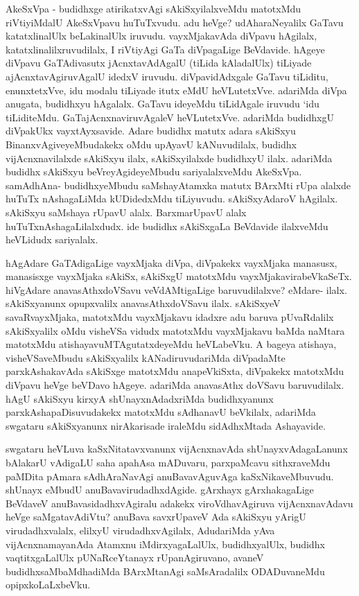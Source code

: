 \begin{artha}
AkeSxVpa - budidhxge atirikatxvAgi sAkiSxyilalxveMdu matotxMdu riVtiyiMdalU AkeSxVpavu huTuTxvudu. adu heVge? udAharaNeyalilx GaTavu katatxlinalUlx beLakinalUlx iruvudu. vayxMjakavAda diVpavu hAgilalx, katatxlinalilxruvudilalx, I riVtiyAgi GaTa diVpagaLige BeVdavide. hAgeye diVpavu GaTAdivasutx jAcnxtavAdAgalU (tiLida kAladalUlx) tiLiyade ajAcnxtavAgiruvAgalU idedxV iruvudu. diVpavidAdxgale GaTavu tiLiditu, enunxtetxVve, idu modalu tiLiyade itutx eMdU heVLutetxVve. adariMda diVpa anugata, budidhxyu hAgalalx. GaTavu ideyeMdu tiLidAgale iruvudu `idu tiLiditeMdu. GaTajAcnxnaviruvAgaleV heVLutetxVve. adariMda budidhxgU diVpakUkx vayxtAyxsavide. Adare budidhx matutx adara sAkiSxyu BinanxvAgiveyeMbudakekx oMdu upAyavU kANuvudilalx, budidhx vijAcnxnavilalxde sAkiSxyu ilalx, sAkiSxyilalxde budidhxyU ilalx. adariMda budidhx sAkiSxyu beVreyAgideyeMbudu sariyalalxveMdu AkeSxVpa. samAdhAna- budidhxyeMbudu saMshayAtamxka matutx BArxMti rUpa alalxde huTuTx nAshagaLiMda kUDidedxMdu tiLiyuvudu. sAkiSxyAdaroV hAgilalx. sAkiSxyu saMshaya rUpavU alalx. BarxmarUpavU alalx huTuTxnAshagaLilalxdudx. ide budidhx sAkiSxgaLa BeVdavide ilalxveMdu heVLidudx sariyalalx. 
\end{artha}%

\begin{artha}
hAgAdare GaTAdigaLige vayxMjaka diVpa, diVpakekx vayxMjaka manasusx, manasisxge vayxMjaka sAkiSx, sAkiSxgU matotxMdu vayxMjakavirabeVkaSeTx. hiVgAdare anavasAthxdoVSavu veVdAMtigaLige baruvudilalxve? eMdare- ilalx. sAkiSxyanunx opupxvalilx anavasAthxdoVSavu ilalx. sAkiSxyeV savaRvayxMjaka, matotxMdu vayxMjakavu idadxre adu baruva pUvaRdalilx sAkiSxyalilx oMdu visheVSa vidudx matotxMdu vayxMjakavu baMda naMtara matotxMdu atishayavuMTAgutatxdeyeMdu heVLabeVku. A bageya atishaya, visheVSaveMbudu sAkiSxyalilx kANadiruvudariMda diVpadaMte parxkAshakavAda sAkiSxge matotxMdu anapeVkiSxta, diVpakekx matotxMdu diVpavu heVge beVDavo hAgeye. adariMda anavasAthx doVSavu baruvudilalx. hAgU sAkiSxyu kirxyA shUnayxnAdadxriMda budidhxyanunx parxkAshapaDisuvudakekx matotxMdu sAdhanavU beVkilalx, adariMda swgataru sAkiSxyanunx nirAkarisade iraleMdu sidAdhxMtada Ashayavide. 
\end{artha}

\begin{artha}
swgataru heVLuva kaSxNitatavxvanunx vijAcnxnavAda shUnayxvAdagaLanunx bAlakarU vAdigaLU saha apahAsa mADuvaru, parxpaMcavu sithxraveMdu paMDita pAmara sAdhAraNavAgi anuBavavAguvAga kaSxNikaveMbuvudu. shUnayx eMbudU anuBavavirudadhxdAgide. gArxhayx gArxhakagaLige BeVdaveV anuBavasidadhxvAgiralu adakekx viroVdhavAgiruva vijAcnxnavAdavu heVge saMgatavAdiVtu? anuBava savxrUpaveV Ada sAkiSxyu yArigU virudadhxvalalx, elilxyU virudadhxvAgilalx, AdudariMda yAva vijAcnxnamayanAda Atamxnu iMdirxyagaLalUlx, budidhxyalUlx, budidhx vaqtitxgaLalUlx pUNaRceYtanayx rUpanAgiruvano, avaneV budidhxsaMbaMdhadiMda BArxMtanAgi saMsAradalilx ODADuvaneMdu opipxkoLaLxbeVku. 
\end{artha}%

